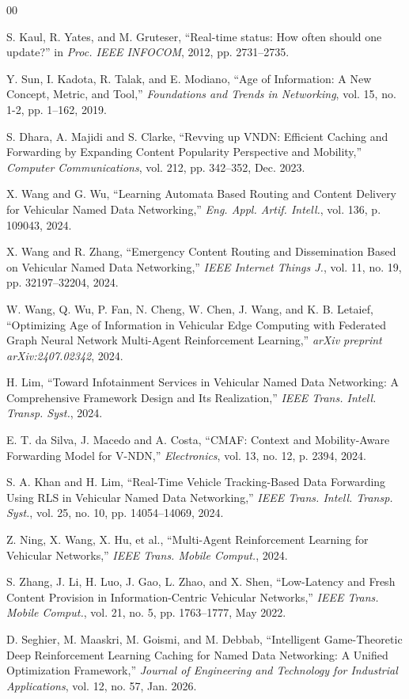 \documentclass[journal]{IEEEtran}
\begin{document}
\begin{thebibliography}{00}

 S. Kaul, R. Yates, and M. Gruteser, ``Real-time status: How often should one update?'' in \emph{Proc. IEEE INFOCOM}, 2012, pp. 2731--2735.

 Y. Sun, I. Kadota, R. Talak, and E. Modiano, ``Age of Information: A New Concept, Metric, and Tool,'' \emph{Foundations and Trends in Networking}, vol. 15, no. 1-2, pp. 1--162, 2019.

 S. Dhara, A. Majidi and S. Clarke, ``Revving up VNDN: Efficient Caching and Forwarding by Expanding Content Popularity Perspective and Mobility,'' \emph{Computer Communications}, vol. 212, pp. 342--352, Dec. 2023.

 X. Wang and G. Wu, ``Learning Automata Based Routing and Content Delivery for Vehicular Named Data Networking,'' \emph{Eng. Appl. Artif. Intell.}, vol. 136, p. 109043, 2024.

 X. Wang and R. Zhang, ``Emergency Content Routing and Dissemination Based on Vehicular Named Data Networking,'' \emph{IEEE Internet Things J.}, vol. 11, no. 19, pp. 32197--32204, 2024.

 W. Wang, Q. Wu, P. Fan, N. Cheng, W. Chen, J. Wang, and K. B. Letaief, ``Optimizing Age of Information in Vehicular Edge Computing with Federated Graph Neural Network Multi-Agent Reinforcement Learning,'' \emph{arXiv preprint arXiv:2407.02342}, 2024.

 H. Lim, ``Toward Infotainment Services in Vehicular Named Data Networking: A Comprehensive Framework Design and Its Realization,'' \emph{IEEE Trans. Intell. Transp. Syst.}, 2024.

 E. T. da Silva, J. Macedo and A. Costa, ``CMAF: Context and Mobility-Aware Forwarding Model for V-NDN,'' \emph{Electronics}, vol. 13, no. 12, p. 2394, 2024.

 S. A. Khan and H. Lim, ``Real-Time Vehicle Tracking-Based Data Forwarding Using RLS in Vehicular Named Data Networking,'' \emph{IEEE Trans. Intell. Transp. Syst.}, vol. 25, no. 10, pp. 14054--14069, 2024.

 Z. Ning, X. Wang, X. Hu, et al., ``Multi-Agent Reinforcement Learning for Vehicular Networks,'' \emph{IEEE Trans. Mobile Comput.}, 2024.

 S. Zhang, J. Li, H. Luo, J. Gao, L. Zhao, and X. Shen, ``Low-Latency and Fresh Content Provision in Information-Centric Vehicular Networks,'' \emph{IEEE Trans. Mobile Comput.}, vol. 21, no. 5, pp. 1763--1777, May 2022.

 D. Seghier, M. Maaskri, M. Goismi, and M. Debbab, ``Intelligent Game-Theoretic Deep Reinforcement Learning Caching for Named Data Networking: A Unified Optimization Framework,'' \emph{Journal of Engineering and Technology for Industrial Applications}, vol. 12, no. 57, Jan. 2026.

\end{thebibliography}
\end{document}
